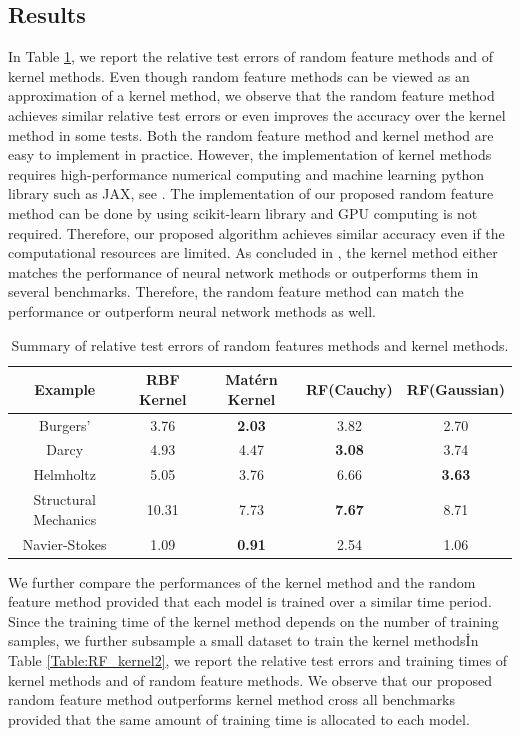 \documentclass[11pt,twoside]{article}
\theoremstyle{plain}
\theoremstyle{definition}
\theoremstyle{remark}
\begin{document}
\subsection{Results}
In Table \ref{Table:RF_kernel}, we report the relative test errors of random feature methods and of kernel methods. 
Even though random feature methods can be viewed as an approximation of a kernel method, we observe that the random feature method achieves similar relative test errors or even improves the accuracy over the kernel method in some tests. 
Both the random feature method and kernel method are easy to implement in practice. 
However, the implementation of kernel methods requires high-performance numerical computing and machine learning python library such as JAX, see \cite{BATLLE2024kernel}. 
The implementation of our proposed random feature method can be done by using scikit-learn library and GPU computing is not required. 
Therefore, our proposed algorithm achieves similar accuracy even if the computational resources are limited.
As concluded in \cite{BATLLE2024kernel}, the kernel method either matches the performance of neural network methods or outperforms them in several benchmarks. Therefore, the random feature method can match the performance or outperform neural network methods as well.

\begin{table}[!htbp]
\centering
\begin{tabular}{|c|c|c|c|c|}
\hline
Example & RBF Kernel & Mat{\' e}rn Kernel  &  RF(Cauchy) & RF(Gaussian) \\\hline
Burgers' &  3.76 & {\bf 2.03} & 3.82 & 2.70 \\\hline
Darcy & 4.93 & 4.47 & {\bf 3.08} & 3.74 \\\hline
Helmholtz & 5.05 & 3.76 & 6.66 & {\bf 3.63} \\\hline
Structural Mechanics & 10.31 & 7.73 & {\bf 7.67} & 8.71 \\\hline
Navier-Stokes & 1.09 & {\bf 0.91} & 2.54 & 1.06 \\\hline
\end{tabular}
\caption{Summary of relative test errors of random features methods and kernel methods.}
\label{Table:RF_kernel}
\end{table}
We further compare the performances of the kernel method and the random feature method provided that each model is trained over a similar time period. 
Since the training time of the kernel method depends on the number of training samples, we further subsample a small dataset to train the kernel methods\.
In Table \ref{Table:RF_kernel2}, we report the relative test errors and training times of kernel methods and of random feature methods. We observe that our proposed random feature method outperforms kernel method cross all benchmarks provided that the same amount of training time is allocated to each model.
\end{document}
